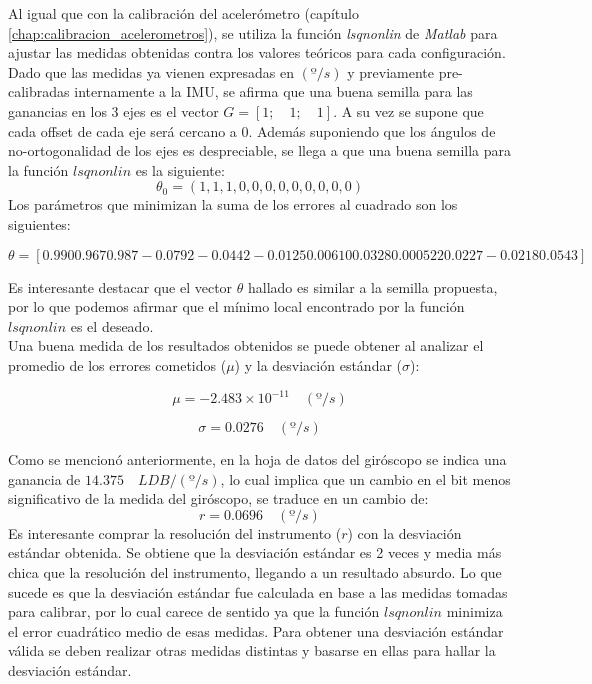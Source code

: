 \documentclass[main]{subfiles}
\begin{document}
Al igual que con la calibración del acelerómetro (capítulo \ref{chap:calibracion_acelerometros}), se utiliza la función \emph{lsqnonlin} de \emph{Matlab} para ajustar las medidas obtenidas contra los valores teóricos para cada configuración. Dado que las medidas ya vienen expresadas en $(º/s)$ y previamente pre-calibradas internamente a la IMU, se afirma que una buena semilla para las ganancias en los 3 ejes es el vector $G=[1;\quad 1;\quad 1]$. A su vez se supone que cada offset de cada eje será cercano a 0. Además suponiendo que los ángulos de no-ortogonalidad de los ejes es despreciable, se llega a que una buena semilla para la función $lsqnonlin$ es la siguiente:
$$\theta _0=\left(1,1,1,0,0,0,0,0,0,0,0,0\right)$$
Los parámetros que minimizan la suma de los errores al cuadrado son los siguientes:
\begin{scriptsize}
$$\theta=\left[ 0.990 0.967 0.987 -0.0792 -0.0442 -0.0125 0.00610 0.0328 0.000522 0.0227 -0.0218 0.0543\right]$$
\end{scriptsize}
Es interesante destacar que el vector $\theta$ hallado es similar a la semilla propuesta, por lo que podemos afirmar que el mínimo local encontrado por la función $lsqnonlin$ es el deseado.\\

Una buena medida de los resultados obtenidos se puede obtener al analizar el promedio de los errores cometidos ($\mu$) y la desviación estándar ($\sigma$):

\begin{equation}
\mu=-2.483 \times 10^{-11} \quad (º/s)
\label{ec:mu_gyro}
\end{equation}

\begin{equation}
\sigma=0.0276 \quad (º/s)
\label{ec:sigma_gyro}
\end{equation}

Como se mencionó anteriormente, en la hoja de datos del giróscopo se indica una ganancia de $14.375\quad LDB/(º/s)$, lo cual implica que un cambio en el bit menos significativo de la medida del giróscopo, se traduce en un cambio de:
\begin{equation}
r=0.0696 \quad (º/s)
\label{ec:fs}
\end{equation}
Es interesante comprar la resolución del instrumento ($r$) con la desviación estándar obtenida. Se obtiene que la desviación estándar es 2 veces y media más chica que la resolución del instrumento, llegando a un resultado absurdo. Lo que sucede es que la desviación estándar fue calculada en base a las medidas tomadas para calibrar, por lo cual carece de sentido ya que la función $lsqnonlin$ minimiza el error cuadrático medio de esas medidas. Para obtener una desviación estándar válida se deben realizar otras medidas distintas y basarse en ellas para hallar la desviación estándar.
\end{document}

